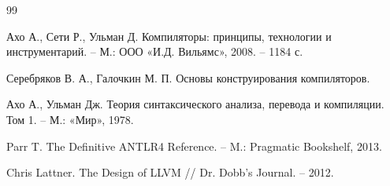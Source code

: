 


\begin{thebibliography}{99}

Ахо А., Сети Р., Ульман Д.
Компиляторы: принципы, технологии и инструментарий. – М.: ООО «И.Д. Вильямс», 2008. – 1184 с.

Серебряков В. А., Галочкин М. П.
Основы конструирования компиляторов.

Ахо А., Ульман Дж.
Теория синтаксического анализа, перевода и компиляции. Том 1. – М.: «Мир», 1978.

Parr T. The Definitive ANTLR4 Reference. – M.: Pragmatic Bookshelf, 2013.

Chris Lattner.  
The Design of LLVM // Dr. Dobb’s Journal. – 2012.

\end{thebibliography}
